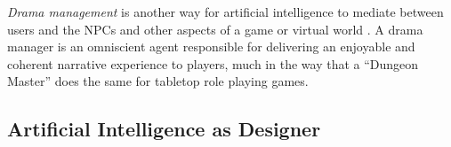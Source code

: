 \documentclass[conference]{IEEEtran}
\begin{document}
{\em Drama management} is another way for artificial intelligence to mediate between users and the NPCs and other aspects of a game or virtual world \cite{mateas1999:oz-review-dm, roberts2008:dm-review, riedl2013:in-aimag}. 
A drama manager is an omniscient agent responsible for delivering an enjoyable and coherent narrative experience to players, much in the way that a ``Dungeon Master'' does the same for tabletop role playing games.

\subsection{Artificial Intelligence as Designer}
\end{document}
